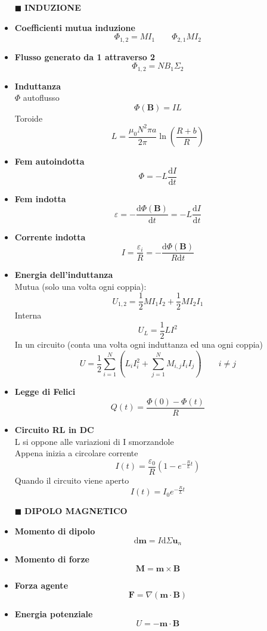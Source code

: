 \documentclass{book}
\newcommand{\g}{\textbf}
\newcommand{\h}{\mathbf}
\newcommand{\e}{\begin{equation}}
\newcommand{\ex}{\end{equation} }
\renewcommand{\it}{\item[$\cdot$]}
\begin{document}
\begin{multicols*}{4}
\begin{itemize}
\item [$\blacksquare$] \g{INDUZIONE}
    \it \g{Coefficienti mutua induzione}
        \e{\Phi_{1,2}=MI_1 \qquad \Phi_{2,1}MI_2} \ex
    \it \g{Flusso generato da 1 attraverso 2} 
        \e{\Phi_{1,2}=NB_1\Sigma_2} \ex
    \it \g{Induttanza}\\
        $\Phi$ autoflusso
        \e{\Phi(\h{B})=IL} \ex
        Toroide 
        \e{L = \frac{\mu_0 N^2 \pi a}{2\pi} \ln\left(\frac{R+b}{R}\right)}\ex
    \it \g{Fem autoindotta}
        \e{\Phi=-L\frac{\mathrm{d}I}{\mathrm{d}t}} \ex
    \it \g{Fem indotta}
        \e{\varepsilon=-\frac{\mathrm{d}\Phi(\h{B})}{\mathrm{d}t}}=-L\frac{\mathrm{d}I}{\mathrm{d}t} \ex
    \it \g{Corrente indotta}
        \e{I=\frac{\varepsilon_i}{R}=-\frac{\mathrm{d}\Phi(\h{B})}{R\mathrm{d}t}} \ex
    \it \g{Energia dell'induttanza} \\
        Mutua (solo una volta ogni coppia):
        \e{U_{1,2}=\frac{1}{2}MI_1I_2+\frac{1}{2}MI_2I_1}\ex
        Interna
        \e{U_L=\frac{1}{2}LI^2} \ex
        In un circuito (conta una volta ogni induttanza ed una ogni coppia)
        \e{U=\frac{1}{2}\sum_{i=1}^N(L_iI_i^2+\sum_{j=1}^N M_{i,j}I_iI_j) \qquad i\neq j} \ex
    \it \g{Legge di Felici}
        \e{Q(t)=\frac{\Phi(0)-\Phi(t)}{R}} \ex
    \it \g{Circuito RL in DC}\\
        L si oppone alle variazioni di I smorzandole \\
        Appena inizia a circolare corrente \\
        \e{I(t)=\frac{\varepsilon_0}{R}(1-e^{-\frac{R}{L}t})} \ex
        Quando il circuito viene aperto \\
        \e{I(t)=I_0 e^{-\frac{R}{L}t}} \ex

\item [$\blacksquare$] \g{DIPOLO MAGNETICO}
    \it \g{Momento di dipolo}
        \e{\mathrm{d}\h{m}=I\mathrm{d}\Sigma\h{u}_n} \ex
    \it \g{Momento di forze}
        \e{\h{M}=\h{m}\times\h{B}} \ex
    \it \g{Forza agente}
        \e{\h{F}=\nabla(\h{m}\cdot\h{B})} \ex
    \it \g{Energia potenziale}
        \e{U=-\h{m}\cdot\h{B}} \ex
        

\end{itemize}
\end{multicols*}
\end{document}
